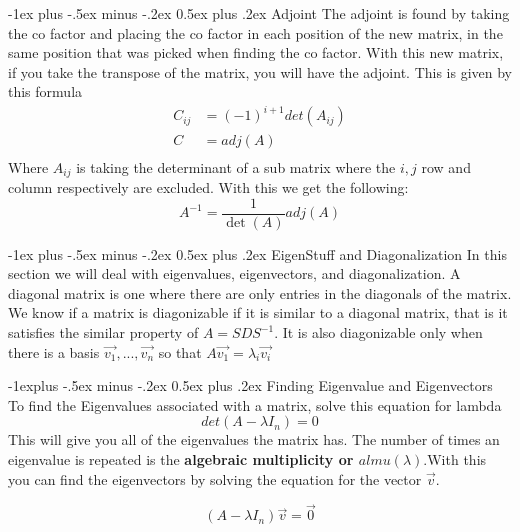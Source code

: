 \documentclass[10pt,landscape]{article}
\makeatletter
\renewcommand{\section}{\@startsection{section}{1}{0mm}%
                                {-1ex plus -.5ex minus -.2ex}%
                                {0.5ex plus .2ex}%
                                {\normalfont\large\bfseries}}
\renewcommand{\subsection}{\@startsection{subsection}{2}{0mm}%
                                {-1explus -.5ex minus -.2ex}%
                                {0.5ex plus .2ex}%
                                {\normalfont\normalsize\bfseries}}
\makeatother
\begin{document}
\begin{multicols}{3}
\section{Adjoint}
The adjoint is found by taking the co factor and placing the co factor in each position of the new matrix, in the same position that was picked when finding the co factor. With this new matrix, if you take the transpose of the matrix, you will have the adjoint. This is given by this formula
\begin{align*}
    C_{ij}&=(-1)^{i+1} det(A_{ij})\\
    C&=adj(A)\\
\end{align*}{}
Where $A_{ij}$ is taking the determinant of a sub matrix where the $i,j$ row and column respectively are excluded. With this we get the following:
\begin{equation*}
    A^{-1}=\frac{1}{\det(A)}adj(A)
\end{equation*}{}

\section{EigenStuff and Diagonalization}
In this section we will deal with eigenvalues, eigenvectors, and diagonalization. A diagonal matrix is one where there are only entries in the diagonals of the matrix. We know if a matrix is diagonizable if it is similar to a diagonal matrix, that is it satisfies the similar property of $A=SDS^{-1}$. It is also diagonizable only when there is a basis $\vec{v_1},...,\vec{v_n}$ so that $A\vec{v_1}=\lambda_i\vec{v_i}$


\subsection{Finding Eigenvalue and Eigenvectors}
To find the Eigenvalues associated with a matrix, solve this equation for lambda
\begin{equation*}
    det(A-\lambda I_n)=0
\end{equation*}{}
This will give you all of the eigenvalues the matrix has. The number of times an eigenvalue is repeated is the \textbf{algebraic multiplicity or $almu(\lambda)$}.With this you can find the eigenvectors by solving the equation for the vector $\vec{v}$.

\begin{equation*}
    (A-\lambda I_n)\vec{v}=\vec{0}
\end{equation*}{}


\end{multicols}
\end{document}
